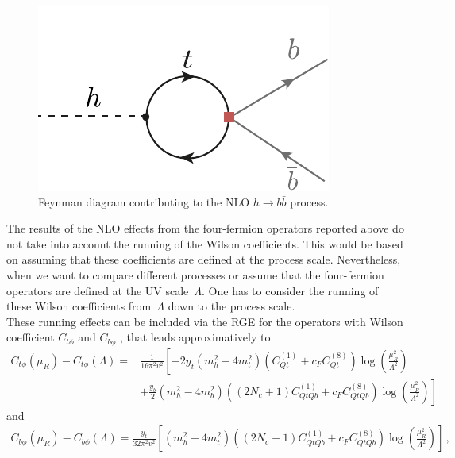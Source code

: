 	\begin{figure}[h!]
		\centering
		\includegraphics[scale=0.8]{./figures/Hbb}
		\caption{Feynman diagram contributing to the NLO   $h \to b \bar b$ process. }
		\label{hbb}
	\end{figure}
	The results of the NLO effects from the four-fermion operators reported above do not take into account the running of the Wilson coefficients. This would be based on assuming that these coefficients are defined at the process scale. Nevertheless, when we want to compare different processes or assume that the four-fermion operators are defined at the UV scale~$\Lambda$. One has to consider the running of these Wilson coefficients from~$\Lambda$ down to the process scale.\\
	These running effects can be included via the RGE for the operators with Wilson coefficient $C_{t\phi}$  and $C_{b\phi}$  \cite{Jenkins:2013zja, Jenkins:2013wua}, that leads approximatively to 
	\begin{equation}
		\begin{split}
			C_{t\phi}(\mu_R)-C_{t\phi}(\Lambda)= &\frac{1}{16 \pi^2 v^2} \left[-2  y_t (m_h^2  -4 m_t^2) (C_{Qt}^{(1)}+c_F C_{Qt}^{(8)} )\log\left( \frac{\mu_R^2}{\Lambda^2}\right) \right.\\
			& \left.+ \frac{y_b}{2} (m_h^2-4 m_b^2)\left(  (2N_c+1)  C_{QtQb}^{(1)}+   c_F C_{QtQb}^{(8)}\right)\log\left( \frac{\mu_R^2}{\Lambda^2}\right)\right] \label{eq:runningCuH}
		\end{split}
	\end{equation}
	and
	\begin{equation}
		\begin{split}
			C_{b\phi}(\mu_R)-C_{b\phi}(\Lambda)= \frac{y_t}{32 \pi^2 v^2} \left[  (m_h^2-4 m_t^2)\left(  (2N_c+1)  C_{QtQb}^{(1)}+   c_F C_{QtQb}^{(8)}\right)\log\left( \frac{\mu_R^2}{\Lambda^2}\right)\right]\,, \label{eq:runningCdH}
		\end{split}
	\end{equation}
